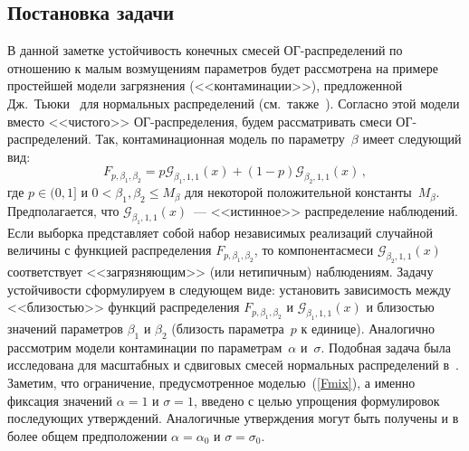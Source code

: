 \begin{multicols}{2}
\section{Постановка задачи}

В данной заметке устойчивость конечных смесей ОГ-рас\-пре\-де\-ле\-ний по
отношению к малым возму\-ще\-ни\-ям параметров будет рассмотрена на
примере простейшей модели загрязнения (<<контаминации>>),
предложенной Дж.~Тьюки~\cite{Tukey1960} для нормальных
распределений (см.\ также~\cite{K2006}). Согласно этой модели
вместо <<чистого>> ОГ-рас\-пре\-де\-ле\-ния, будем рассматривать смеси
ОГ-рас\-пре\-де\-ле\-ний. Так, контаминационная модель по параметру~$\beta$ имеет следующий вид:
\begin{equation}
F_{p,\beta_1,\beta_2} = p {\mathcal G}_{\beta_1,1,1}(x) +
(1-p){\mathcal G}_{\beta_2,1,1}(x)\,, \label{Fmix}
\end{equation}
где $p\in(0,1]$ и $0 < \beta_1,\beta_2 \leqslant M_{\beta}$ для
некоторой положительной константы~$M_{\beta}$. Предполагается, что\linebreak
${\mathcal G}_{\beta_1,1,1}(x)$~--- <<истинное>> распределение
наблюдений. Если выборка представляет собой набор независимых
реализаций случайной величины с функцией распределения
$F_{p,\beta_1,\beta_2}$, то компонента\linebreak смеси ${\mathcal
G}_{\beta_2,1,1}(x)$ соответствует <<загрязняющим>> (или
нетипичным) наблюдениям. Задачу устойчивости сформулируем в
следующем виде: установить зависимость между <<близостью>> функций
распределения $F_{p,\beta_1,\beta_2}$ и ${\mathcal
G}_{\beta_1,1,1}(x)$ и близостью значений па\-ра\-мет\-ров $\beta_1$ и
$\beta_2$ (близость па\-ра\-мет\-ра~$p$ к единице). Аналогично
рассмотрим модели контаминации по параметрам~$\alpha$ и~$\sigma$.
Подобная задача была исследована для масштабных и сдвиговых смесей
нормальных распределений в~\cite{Korolev2007s}. Заметим, что
ограничение, предусмотренное моделью~(\ref{Fmix}), а именно
фиксация значений $\alpha=1$ и $\sigma=1$, введено с целью
упрощения формулировок последующих утверждений. Аналогичные
утверждения могут быть получены и в более общем предположении
$\alpha=\alpha_0$ и $\sigma=\sigma_0$.


\end{multicols}
